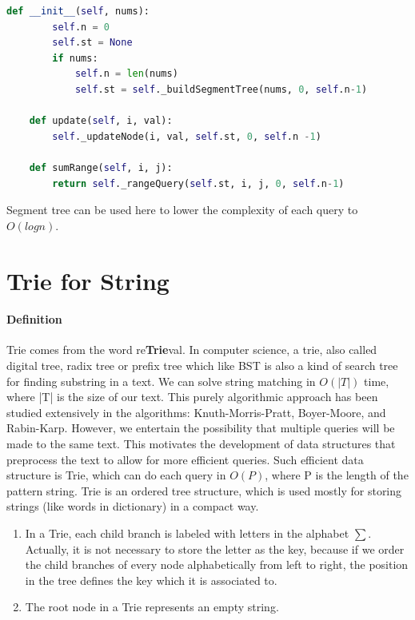 \documentclass[data-structure.tex]{subfiles}
\begin{document}
\begin{examples}[resume]
\begin{lstlisting}[language=Python]
    def __init__(self, nums):
        self.n = 0
        self.st = None
        if nums:
            self.n = len(nums)
            self.st = self._buildSegmentTree(nums, 0, self.n-1)    
            
    def update(self, i, val):
        self._updateNode(i, val, self.st, 0, self.n -1)       

    def sumRange(self, i, j):
        return self._rangeQuery(self.st, i, j, 0, self.n-1)
\end{lstlisting}
\end{examples}

 

Segment tree can be used here to lower the complexity of each query to $O(log n)$. 

\section{Trie for String}
\label{concept_trie}
\paragraph{Definition} Trie comes from the word re\textbf{Trie}val. In computer science, a trie, also called digital tree, radix tree or prefix tree which like BST is also a kind of search tree for finding substring in a text. We can solve string matching in $O(|T|)$ time,  where |T| is the size of our text.  This purely algorithmic approach has been studied extensively in the algorithms:  Knuth-Morris-Pratt, Boyer-Moore, and Rabin-Karp. However, we entertain the possibility that multiple queries will be made to the same text.  This motivates the development of data structures that preprocess the text to allow for more efficient queries. Such efficient data structure is Trie, which can do each query in $O(P)$, where P is the length of the pattern string. Trie is an ordered tree structure, which is used mostly for storing strings (like words in dictionary) in a compact way. 
\begin{enumerate}
    \item In a Trie, each child branch is labeled with letters in the alphabet $\sum$. Actually, it is not necessary to store the letter as the key, because if we  order the child branches of every node alphabetically from left to right, the position in the tree defines the key which it is associated to. 
    \item The root node in a Trie represents an empty string. 
\end{enumerate}
\end{document}
